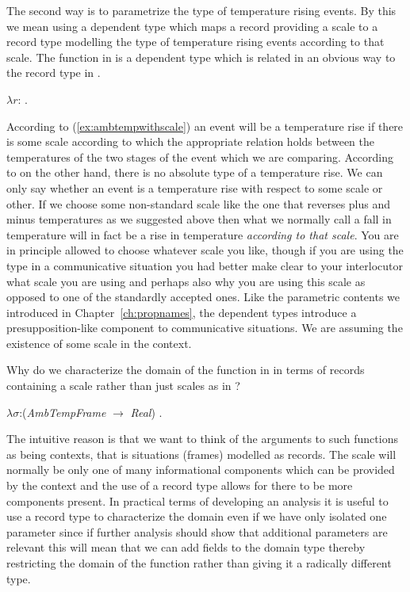 The second way is to parametrize the type of temperature rising
events.  By this we mean using a dependent type which maps a record
providing a scale to
a record type modelling the type of temperature rising events
according to that scale.  The function in \nexteg{} is a dependent
type which is related in an obvious way to the record type in
\preveg{}.
\begin{ex} 
$\lambda r$: .\\  
\hspace*{2em}
\end{ex} 
According to (\ref{ex:ambtempwithscale}) an event will be a
temperature rise if there is some scale according to which the appropriate
relation holds between the temperatures of the two stages of the event
which we are comparing.  According to \preveg{} on the other hand,
there is no absolute type of a temperature rise.  We can only say
whether an event is a temperature rise with respect to some scale or
other.  If we choose some non-standard scale like the one that
reverses plus and minus temperatures as we suggested above then what
we normally call a fall in temperature will in fact be a rise in
temperature \textit{according to that scale}.  You are in principle
allowed to choose whatever scale you like, though if you are using the
type in a communicative situation you had better make clear to your
interlocutor what scale you are using and perhaps also why you are
using this scale as opposed to one of the standardly accepted ones.
Like the parametric contents we introduced in
Chapter~\ref{ch:propnames}, the dependent types introduce a
presupposition-like component to communicative situations.  We are
assuming the existence of some scale in the context.

Why do we characterize the domain of the function in \preveg{} in
terms of records containing a scale rather than just scales as in
\nexteg{}?
\begin{ex} 
$\lambda \sigma$:(\textit{AmbTempFrame}
    $\rightarrow$ \textit{Real}) .\\  
\hspace*{2em} 
\end{ex} 
The intuitive reason is that we want to think of the arguments to such
functions as being contexts, that is situations (frames) modelled as
records.  The scale will normally be only one of many informational
components which can be provided by the context and the use of a
record type allows for there to be more components present.  In
practical terms of developing an analysis it is useful to use a record
type to characterize the domain even if we have only isolated one
parameter since if further analysis should show that additional
parameters are relevant this will mean that we can add fields to the
domain type thereby restricting the domain of the function rather than
giving it a radically different type.

